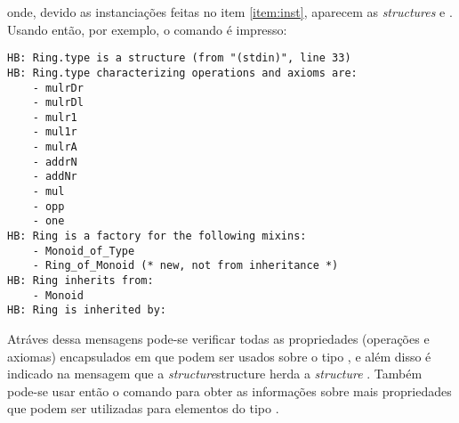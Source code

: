 {{\begin{enumerate}
        onde, devido as instanciações feitas no item \ref{item:inst}, aparecem as \textit{structures}  e . Usando então, por exemplo, o comando  é impresso:
            \begin{lstlisting}[language=coq-error, frame=single, tabsize=1]
HB: Ring.type is a structure (from "(stdin)", line 33)
HB: Ring.type characterizing operations and axioms are:
    - mulrDr
    - mulrDl
    - mulr1
    - mul1r
    - mulrA
    - addrN
    - addNr
    - mul
    - opp
    - one
HB: Ring is a factory for the following mixins:
    - Monoid_of_Type
    - Ring_of_Monoid (* new, not from inheritance *)
HB: Ring inherits from:
    - Monoid
HB: Ring is inherited by:
            \end{lstlisting}
    Atráves dessa mensagens pode-se verificar todas as propriedades (operações e axiomas) encapsulados em  que podem ser usados sobre o tipo , e além disso é indicado na mensagem que a \textit{structure}{structure}  herda a \textit{structure} . Também pode-se usar então o comando  para obter as informações sobre mais propriedades que podem ser utilizadas para elementos do tipo .


    \end{enumerate}





    
        

}}
